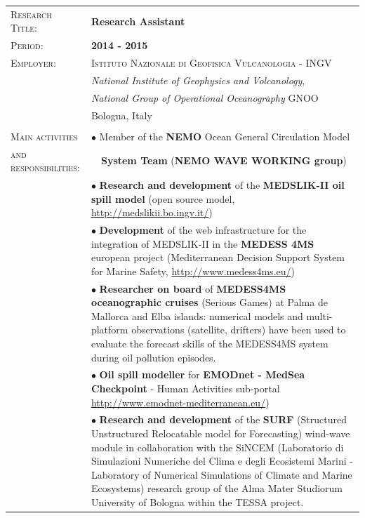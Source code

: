 \documentclass[a4paper, oneside, final]{scrartcl}
\newcommand{\gray}{\rowcolor[gray]{.90}} %
\begin{document}
\begin{tabularx}{0.97\linewidth}{>{\raggedright\scshape}p{4.4cm}|X}
\gray \textsc{Research Title:}  & \textbf{Research Assistant}\\
\gray \textsc{Period:}          & \textbf{2014 - 2015}\\
\textsc{Employer:}        & \textsc{Istituto Nazionale di Geofisica Vulcanologia - INGV} \\
                          & \textit{National Institute of Geophysics and Volcanology},\\
                          & \textit{National Group of Operational Oceanography} GNOO\\         
                           & Bologna, Italy\\
                                 & \\
\textsc{Main activities}        & $\bullet$ Member of the \textbf{NEMO} Ocean General Circulation Model \\
\textsc{and responsibilities:}  & \ \ \textbf{System Team} (\textbf{NEMO WAVE WORKING group}) \\
                                & $\bullet$ \textbf{Research and development} of the \textbf{MEDSLIK-II oil spill model} (open source model, \url{http://medslikii.bo.ingv.it/}) \\                                  
                                & $\bullet$ \textbf{Development} of the web infrastructure for the integration of MEDSLIK-II in the \textbf{MEDESS 4MS} european project (Mediterranean Decision Support System for Marine Safety, \url{http://www.medess4ms.eu/}) \\
                                & $\bullet$ \textbf{Researcher on board} of \textbf{MEDESS4MS oceanographic cruises} (Serious Games) at Palma de Mallorca and Elba islands: numerical models and multi-platform observations (satellite, drifters) have been used to evaluate the forecast skills of the MEDESS4MS system during oil pollution episodes.\\
                                & $\bullet$  \textbf{Oil spill modeller} for \textbf{EMODnet - MedSea Checkpoint} - Human Activities sub-portal \url{http://www.emodnet-mediterranean.eu/})\\
                                & $\bullet$ \textbf{Research and development} of the \textbf{SURF} (Structured Unstructured Relocatable model for Forecasting) wind-wave module in collaboration with the SiNCEM (Laboratorio di Simulazioni Numeriche del Clima e degli Ecosistemi Marini - Laboratory of Numerical Simulations of Climate and Marine Ecosystems) research group of the Alma Mater Studiorum University of Bologna within the TESSA project. \\
\end{tabularx}          
\end{document}
